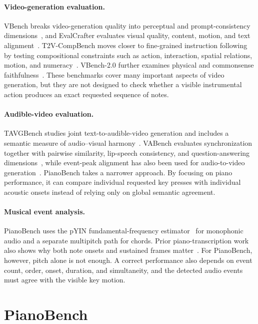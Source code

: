 \documentclass{article}
\begin{document}
\paragraph{Video-generation evaluation.}
VBench breaks video-generation quality into perceptual and prompt-consistency dimensions~\citep{huang2024vbench}, and EvalCrafter evaluates visual quality, content, motion, and text alignment~\citep{liu2024evalcrafter}. T2V-CompBench moves closer to fine-grained instruction following by testing compositional constraints such as action, interaction, spatial relations, motion, and numeracy~\citep{sun2025t2vcompbench}. VBench-2.0 further examines physical and commonsense faithfulness~\citep{zheng2025vbench2}. These benchmarks cover many important aspects of video generation, but they are not designed to check whether a visible instrumental action produces an exact requested sequence of notes.

\paragraph{Audible-video evaluation.}
TAVGBench studies joint text-to-audible-video generation and includes a semantic measure of audio--visual harmony~\citep{mao2024tavgbench}. VABench evaluates synchronization together with pairwise similarity, lip-speech consistency, and question-answering dimensions~\citep{hua2026vabench}, while event-peak alignment has also been used for audio-to-video generation~\citep{yariv2024diverse}. PianoBench takes a narrower approach. By focusing on piano performance, it can compare individual requested key presses with individual acoustic onsets instead of relying only on global semantic agreement.

\paragraph{Musical event analysis.}
PianoBench uses the pYIN fundamental-frequency estimator~\citep{mauch2014pyin} for monophonic audio and a separate multipitch path for chords. Prior piano-transcription work also shows why both note onsets and sustained frames matter~\citep{hawthorne2018onsets}. For PianoBench, however, pitch alone is not enough. A correct performance also depends on event count, order, onset, duration, and simultaneity, and the detected audio events must agree with the visible key motion.

\section{PianoBench}
\label{sec:benchmark}
\end{document}
